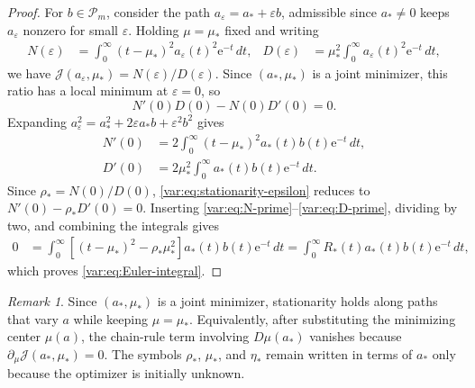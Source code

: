 \documentclass[11pt]{article}
\numberwithin{equation}{section}
\theoremstyle{definition}
\theoremstyle{remark}
\newtheorem{remark}[theorem]{Remark}
\newcommand{\Pcal}{\mathcal P}
\newcommand{\e}{\mathrm e}
\begin{document}
\begin{proof}
For \(b\in\Pcal_m\), consider the path \(a_\varepsilon=a_*+\varepsilon b\), admissible since \(a_*\ne0\) keeps \(a_\varepsilon\) nonzero for small \(\varepsilon\). Holding \(\mu=\mu_*\) fixed and writing
\begin{align*}
    N(\varepsilon)
    &=\int_0^\infty
      (t-\mu_*)^2a_\varepsilon(t)^2\e^{-t}\,dt,
      &
    D(\varepsilon)
    &=\mu_*^2\int_0^\infty
      a_\varepsilon(t)^2\e^{-t}\,dt,
\end{align*}
we have \(\mathcal{J}(a_\varepsilon,\mu_*)=N(\varepsilon)/D(\varepsilon)\). Since \((a_*,\mu_*)\) is a joint minimizer, this ratio has a local minimum at \(\varepsilon=0\), so
\begin{equation}\label{var:eq:stationarity-epsilon}
    N'(0)D(0)-N(0)D'(0)=0.
\end{equation}
Expanding \(a_\varepsilon^2=a_*^2+2\varepsilon a_*b+\varepsilon^2b^2\) gives
\begin{align}
    N'(0)
    &=2\int_0^\infty
      (t-\mu_*)^2a_*(t)b(t)\e^{-t}\,dt,
      \label{var:eq:N-prime}\\
    D'(0)
    &=2\mu_*^2\int_0^\infty
      a_*(t)b(t)\e^{-t}\,dt.
      \label{var:eq:D-prime}
\end{align}
Since \(\rho_*=N(0)/D(0)\), \eqref{var:eq:stationarity-epsilon} reduces to \(N'(0)-\rho_*D'(0)=0\). Inserting \eqref{var:eq:N-prime}--\eqref{var:eq:D-prime}, dividing by two, and combining the integrals gives
\begin{align*}
    0
    &=\int_0^\infty
      \left[(t-\mu_*)^2-\rho_*\mu_*^2\right]
      a_*(t)b(t)\e^{-t}\,dt
    =\int_0^\infty
      R_*(t)a_*(t)b(t)\e^{-t}\,dt,
\end{align*}
which proves \eqref{var:eq:Euler-integral}.
\end{proof}

\begin{remark}\label{var:rem:mu-fixed} 
Since $(a_*,\mu_*)$ is a joint minimizer,
stationarity holds along paths that vary $a$ while keeping $\mu=\mu_*$.
Equivalently, after substituting the minimizing center $\mu(a)$, the chain-rule
term involving $D\mu(a_*)$ vanishes because
$\partial_\mu\mathcal J(a_*,\mu_*)=0$. The symbols $\rho_*$, $\mu_*$, and
$\eta_*$ remain written in terms of $a_*$ only because the optimizer is
initially unknown. 
\end{remark}
\end{document}
